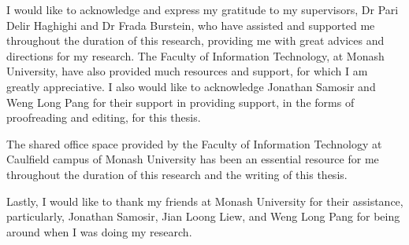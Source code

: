 
\begin{acknowledgements}      

I would like to acknowledge and express my gratitude to my supervisors, Dr Pari Delir Haghighi and Dr Frada Burstein, who have assisted and supported me throughout the duration of this research, providing me with great advices and directions for my research. The Faculty of Information Technology, at Monash University, have also provided much resources and support, for which I am greatly appreciative. I also would like to acknowledge Jonathan Samosir and Weng Long Pang for their support in providing support, in the forms of proofreading and editing, for this thesis.

The shared office space provided by the Faculty of Information Technology at Caulfield campus of Monash University has been an essential resource for me throughout the duration of this research and the writing of this thesis.

Lastly, I would like to thank my friends at Monash University for their assistance, particularly, Jonathan Samosir, Jian Loong Liew, and Weng Long Pang for being around when I was doing my research.

\end{acknowledgements}
